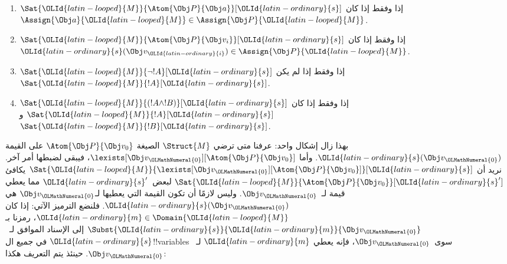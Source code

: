 \documentclass[../../../include/open-logic-section]{subfiles}
\begin{document}
\begin{enumerate}
  \item $\Sat{{\OLId{latin-looped}{M}}}{\Atom{\Obj P}{\Obj a}}[{\OLId{latin-ordinary}{s}}]$ إذا وفقط إذا كان
  $\Assign{\Obj a}{{\OLId{latin-looped}{M}}} \in \Assign{\Obj P}{{\OLId{latin-looped}{M}}}$.
  \item $\Sat{{\OLId{latin-looped}{M}}}{\Atom{\Obj P}{\Obj v_i}}[{\OLId{latin-ordinary}{s}}]$ إذا وفقط إذا كان
  ${\OLId{latin-ordinary}{s}}(\Obj v_{\OLId{latin-ordinary}{i}}) \in \Assign{\Obj P}{{\OLId{latin-looped}{M}}}$.
  \item $\Sat{{\OLId{latin-looped}{M}}}{\lnot !A}[{\OLId{latin-ordinary}{s}}]$ إذا وفقط إذا لم يكن
  $\Sat{{\OLId{latin-looped}{M}}}{!A}[{\OLId{latin-ordinary}{s}}]$.
  \item $\Sat{{\OLId{latin-looped}{M}}}{(!A \land !B)}[{\OLId{latin-ordinary}{s}}]$ إذا وفقط إذا كان
  $\Sat{{\OLId{latin-looped}{M}}}{!A}[{\OLId{latin-ordinary}{s}}]$ و$\Sat{{\OLId{latin-looped}{M}}}{!B}[{\OLId{latin-ordinary}{s}}]$.
\end{enumerate}
بهذا زال إشكال واحد: عرفنا متى ترضي $\Struct{M}$
الصيغة $\Atom{\Obj P}{\Obj v_0}$ على القيمة ${\OLId{latin-ordinary}{s}}(\Obj v_{\OLMathNumeral{0}})$.
وأما $\lexists[\Obj v_{\OLMathNumeral{0}}][\Atom{\Obj P}{\Obj v_0}]$، فيبقى
لضبطها أمر آخر. نريد أن
$\Sat{{\OLId{latin-looped}{M}}}{\lexists[\Obj v_{\OLMathNumeral{0}}][\Atom{\Obj P}{\Obj v_0}]}[{\OLId{latin-ordinary}{s}}]$
يكافئ $\Sat{{\OLId{latin-looped}{M}}}{\Atom{\Obj P}{\Obj v_0}}[{\OLId{latin-ordinary}{s}}']$ لبعض~${\OLId{latin-ordinary}{s}}'$
مما يعطي قيمة لـ~$\Obj v_{\OLMathNumeral{0}}$. وليس لازمًا أن تكون القيمة التي
يعطيها لـ$\Obj v_{\OLMathNumeral{0}}$ هي ${\OLId{latin-ordinary}{s}}(\Obj v_{\OLMathNumeral{0}})$. فلنضع الترميز الآتي:
إذا كان ${\OLId{latin-ordinary}{m}} \in \Domain{{\OLId{latin-looped}{M}}}$، رمزنا بـ
$\Subst{{\OLId{latin-ordinary}{s}}}{{\OLId{latin-ordinary}{m}}}{\Obj v_{\OLMathNumeral{0}}}$ إلى الإسناد الموافق لـ~${\OLId{latin-ordinary}{s}}$ في جميع
ال!!{variable}s سوى~$\Obj v_{\OLMathNumeral{0}}$، فإنه يعطي ${\OLId{latin-ordinary}{m}}$ لـ~$\Obj v_{\OLMathNumeral{0}}$.
حينئذ يتم التعريف هكذا:
\end{document}
